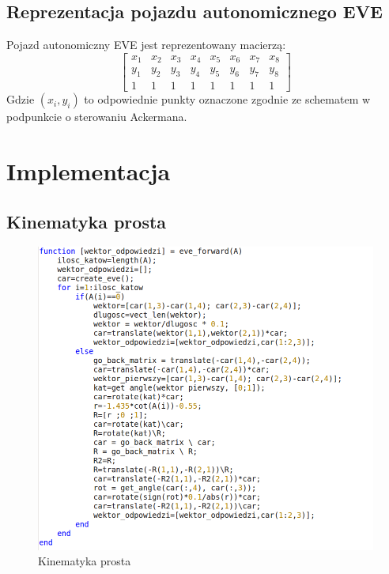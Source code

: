 \documentclass[a4paper, 12pt]{report}
\begin{document}
		\section{Reprezentacja pojazdu autonomicznego EVE}
			Pojazd autonomiczny EVE jest reprezentowany macierzą:
			$$
				\begin{bmatrix}
					x_1 & x_2 & x_3 & x_4 & x_5 & x_6 & x_7 & x_8 \\ 
					y_1 & y_2 & y_3 & y_4 & y_5 & y_6 & y_7 & y_8 \\ 
					1 & 1 & 1 & 1 & 1 & 1 & 1 & 1
				\end{bmatrix}
			$$
			Gdzie $(x_i,y_i)$ to odpowiednie punkty oznaczone zgodnie ze schematem w podpunkcie o sterowaniu Ackermana.
	\chapter{Implementacja}
		\section{Kinematyka prosta}
			\begin{figure}[H]
				\centering
				\includegraphics[width = \textwidth]{./img/fwd.png}
				\caption{Kinematyka prosta}
			\end{figure}
\end{document}
